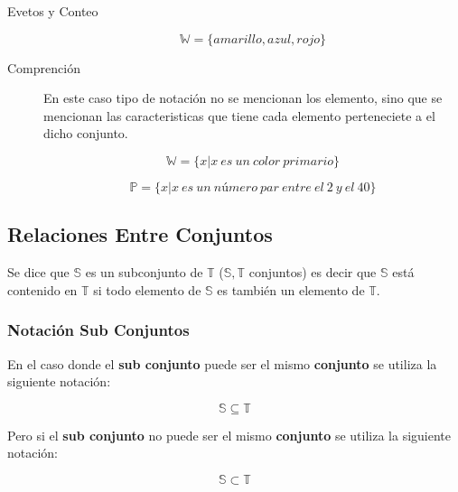 \documentclass[a4paper]{book}
\begin{document}
\begin{chapter}{Evetos y Conteo}
\begin{description}
            \begin{equation*}
            \label{eq:1.5}
                \mathbb W=\{amarillo,azul,rojo\}
            \end{equation*}

        \item[Comprención] En este caso tipo de notación no se mencionan los
            elemento, sino que se mencionan las caracteristicas que tiene cada
            elemento perteneciete a el dicho conjunto.

            \begin{equation*}
            \label{eq:1.6}
                 \mathbb W = \{x|x\ es\ un\ color\ primario\}
            \end{equation*}

            \begin{equation*}
            \label{eq:1.7}
                \mathbb P=\{x|x\ es\ un\ número\ par\ entre\ el\ 2\ y\ el\ 40\}
            \end{equation*}
    \end{description}

    \subsection{Relaciones Entre Conjuntos}
    \label{ssec:relaciones_entre_conjuntos}

    Se dice que $ \mathbb S $ es un subconjunto de $ \mathbb T $ ($ \mathbb
    S,\mathbb T $ conjuntos) es decir que $ \mathbb S $ está contenido en $
    \mathbb T $ si todo elemento de $ \mathbb S $ es también un elemento de $
    \mathbb T $.

    \subsubsection{Notación Sub Conjuntos}
    \label{ssec:notacion_sub_conjuntos}

    En el caso donde el \textbf{sub conjunto} puede ser el mismo
    \textbf{conjunto} se utiliza la siguiente notación:

    \begin{equation*}
    \label{eq:1.8}
        \mathbb S\subseteq \mathbb T
    \end{equation*}

    Pero si el \textbf{sub conjunto} no puede ser el mismo \textbf{conjunto} se
    utiliza la siguiente notación:

    \begin{equation*}
    \label{eq:1.9}
        \mathbb S\subset \mathbb T
    \end{equation*}


\end{chapter}
\end{document}
